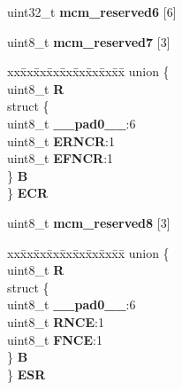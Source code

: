 \begin{DoxyCompactItemize}
\begin{tabbing}
\end{tabbing}\item 
\mbox{\label{structMCM__tag_aed138429560e3c48272aecd16c77b9c5}} 
uint32\+\_\+t {\bfseries mcm\+\_\+reserved6} \mbox{[}6\mbox{]}
\item 
\mbox{\label{structMCM__tag_af1ec232d6c218d016e31185b68a780d1}} 
uint8\+\_\+t {\bfseries mcm\+\_\+reserved7} \mbox{[}3\mbox{]}
\item 
\mbox{\label{structMCM__tag_af679fdc312b8283fa9ab3141198ea850}} 
\begin{tabbing}
xx\=xx\=xx\=xx\=xx\=xx\=xx\=xx\=xx\=\kill
union \{\\
\>uint8\_t {\bfseries R}\\
\>struct \{\\
\>\>uint8\_t {\bfseries \_\_pad0\_\_}:6\\
\>\>uint8\_t {\bfseries ERNCR}:1\\
\>\>uint8\_t {\bfseries EFNCR}:1\\
\>\} {\bfseries B}\\
\} {\bfseries ECR}\\

\end{tabbing}\item 
\mbox{\label{structMCM__tag_affc2e138b7f138b34d176b84a1c78f82}} 
uint8\+\_\+t {\bfseries mcm\+\_\+reserved8} \mbox{[}3\mbox{]}
\item 
\mbox{\label{structMCM__tag_af4cdd43ae4701fb145744b2f2d6dc5ca}} 
\begin{tabbing}
xx\=xx\=xx\=xx\=xx\=xx\=xx\=xx\=xx\=\kill
union \{\\
\>uint8\_t {\bfseries R}\\
\>struct \{\\
\>\>uint8\_t {\bfseries \_\_pad0\_\_}:6\\
\>\>uint8\_t {\bfseries RNCE}:1\\
\>\>uint8\_t {\bfseries FNCE}:1\\
\>\} {\bfseries B}\\
\} {\bfseries ESR}\\


\end{tabbing}
\end{DoxyCompactItemize}
